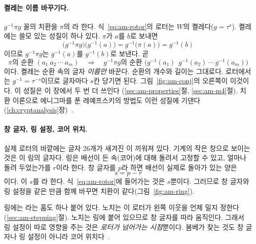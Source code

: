 \paragraph{켤레는 이름 바꾸기다.} $g^{-1}\pi g$ 꼴의 치환을 $\pi$의 라 한다.
식~\eqref{eq:am-rotor}의 로터는 $W$의 켤레다($g = \tau^{s}$). 켤레에는 쓸모 있는 성질이 하나 있다. $\pi$가 $a$를 $b$로
보내면
\[
  \bigl(g^{-1}\pi g\bigr)\bigl(g^{-1}(a)\bigr) = g^{-1}\bigl(\pi(a)\bigr) = g^{-1}(b)
\]
이므로 $g^{-1}\pi g$는 $g^{-1}(a)$를 $g^{-1}(b)$로 보낸다. 곧
\begin{equation}
  \pi \text{의 순환 } (a_1\ a_2\ \cdots\ a_m) \quad\Longrightarrow\quad
  g^{-1}\pi g \text{의 순환 } \bigl(g^{-1}(a_1)\ \ g^{-1}(a_2)\ \cdots\ g^{-1}(a_m)\bigr) \label{eq:am-rename}
\end{equation}
이다. 켤레는 순환 속의 글자 \emph{이름만} 바꾼다. 순환의 개수와 길이는 그대로다. 로터에서는 $g^{-1} = \tau^{-s}$이므로
글자마다 $s$칸 당기면 된다. 그림~\ref{fig:am-conj}의 오른쪽이 이것이다. 이 성질은 이 장에서 두 번 더 쓰인다
(\ref{sec:am-properties}절, \ref{sec:am-m4}절). 치환 이론으로 에니그마를 푼 레예프스키의 방법도 이런 성질에
기댄다(\ref{ch:cryptanalysis}장)~\cite{rejewski1980application}.

\paragraph{창 글자, 링 설정, 코어 위치.} 실제 로터의 바깥에는 글자 26개가 새겨진 이 끼워져 있다.
기계의 작은 창으로 보이는 것은 이 링의 글자다. 링은 배선이 든 속(코어)에 대해 돌려서 고정할 수 있고, 얼마나
돌려 두었는가를  $r$이라 한다. 창 글자를 $p$라 하면 배선이 실제로 돌아가 있는 양은
\begin{equation}
  s = p - r \label{eq:am-core}
\end{equation}
이다. 이 $s$를 라 한다. 식~\eqref{eq:am-rotor}에 들어가는 것은 $s$뿐이다. 그러므로
창 글자와 링 설정을 같은 만큼 함께 바꾸면 치환이 같다(그림~\ref{fig:am-ring}).

링에는 라는 홈도 하나 붙어 있다. 노치는 이 로터가 왼쪽 이웃을 언제 밀지 정한다
(\ref{sec:am-stepping}절). 노치는 링에 붙어 있으므로 창 글자를 따라 움직인다. 그래서 링 설정이 따로 영향을 주는
것은 \emph{로터가 넘어가는 시점}뿐이다. 봄베가 찾는 것도 창 글자나 링 설정이 아니라 코어 위치다~\cite[4]{us6812report1944}.

